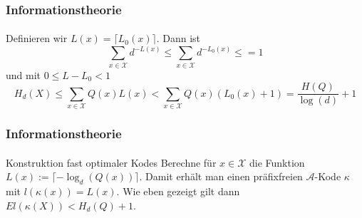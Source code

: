 \documentclass{beamer}
\begin{document}
\begin{frame}
    \frametitle{Informationstheorie}
\framesubtitle{}

\begin{block}{}
Definieren wir $L(x) = \lceil L_0(x) \rceil$. Dann ist 
$$ \sum_{x \in \mathcal{X}} d^{-L(x)} \leq \sum_{x \in \mathcal{X}} d^{-L_0(x)} \leq = 1$$
und mit $0 \leq L - L_0 < 1$ 
$$ H_d(X) \leq  \sum_{x \in \mathcal{X}} Q(x) L(x) <  \sum_{x \in \mathcal{X}} Q(x) (L_0(x) +1) = \frac{H(Q)}{\log(d)} +1$$ 
\end{block}

 \end{frame}

\begin{frame}
    \frametitle{Informationstheorie}
\framesubtitle{}

\begin{block}{Konstruktion fast optimaler Kodes}
Berechne für $x \in \mathcal{X}$ die Funktion $L(x) := \lceil -\log_d(Q(x)) \rceil$. Damit erhält man einen präfixfreien $\mathcal{A}$-Kode
$\kappa$ mit $l(\kappa(x)) = L(x)$. Wie eben gezeigt gilt dann $El(\kappa(X)) < H_d(Q) +1$.
\end{block}

 \end{frame}
\end{document}
